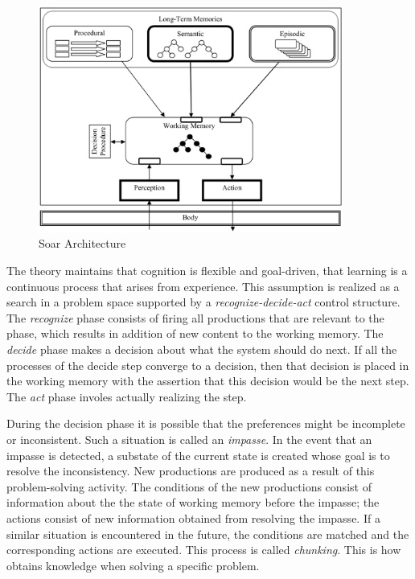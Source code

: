 \begin{figure}[htp]
  \centering
  \includegraphics[width=100mm]{soar.eps}
  \caption{Soar Architecture\cite{Jill-Fain-Lehman:2006aa}}
  \label{SOAR_ARCH}
\end{figure}

The \soar theory maintains that cognition is flexible and goal-driven,
that learning is a continuous process that arises from experience. This assumption
is realized as a search in a problem space supported by a
\emph{recognize-decide-act} control structure\cite{Lewis:2001aa}. The
{\em recognize} phase consists of firing all productions that are relevant
to the phase, which results in addition of new content to the working
memory. The {\em decide} phase makes a decision about what the system should
do next. If all the processes of the decide step converge to a
decision, then that decision is placed in the working memory with the
assertion that this decision would be the next step. The {\em act} phase
involes actually realizing the step. 
 
During the decision phase it is possible that the
preferences might be incomplete or inconsistent. Such a situation is
called an \emph{impasse}. In the event that an impasse is detected, a
substate of the current state is created whose goal is to resolve the
inconsistency. New productions are produced as a result of this
problem-solving activity. The conditions of the new productions
consist of information about the the state of working memory before the
impasse; the actions consist of  new information obtained from
resolving the impasse. If a similar situation is encountered in the
future, the conditions are matched and the corresponding actions are
executed.  This process is called \emph{chunking}.  This is how
\soar obtains knowledge when solving a specific problem.

